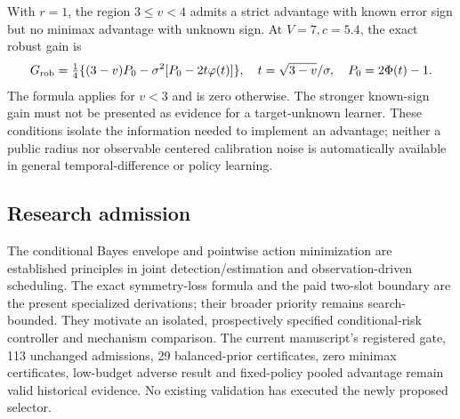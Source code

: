 With $r=1$, the region $3\le v<4$ admits a strict advantage with known error sign but no minimax advantage with unknown sign.
At $V=7,c=5.4$, the exact robust gain is
\[
G_{\rm rob}=\tfrac14\{(3-v)P_0-\sigma^2[P_0-2t\varphi(t)]\},\quad
t=\sqrt{3-v}/\sigma,\quad P_0=2\Phi(t)-1.
\]
The formula applies for $v<3$ and is zero otherwise.
The stronger known-sign gain must not be presented as evidence for a target-unknown learner.
These conditions isolate the information needed to implement an advantage; neither a public radius nor observable centered calibration noise is automatically available in general temporal-difference or policy learning.

\subsection{Research admission}
The conditional Bayes envelope and pointwise action minimization are established principles in joint detection/estimation and observation-driven scheduling.
The exact symmetry-loss formula and the paid two-slot boundary are the present specialized derivations; their broader priority remains search-bounded.
They motivate an isolated, prospectively specified conditional-risk controller and mechanism comparison.
The current manuscript's registered gate, 113 unchanged admissions, 29 balanced-prior certificates, zero minimax certificates, low-budget adverse result and fixed-policy pooled advantage remain valid historical evidence.
No existing validation has executed the newly proposed selector.
